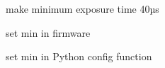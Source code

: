 
\begin{DoxyItemize}
\item make minimum exposure time 40µs
\begin{DoxyItemize}
\item set min in firmware
\item set min in Python config function 
\end{DoxyItemize}
\end{DoxyItemize}